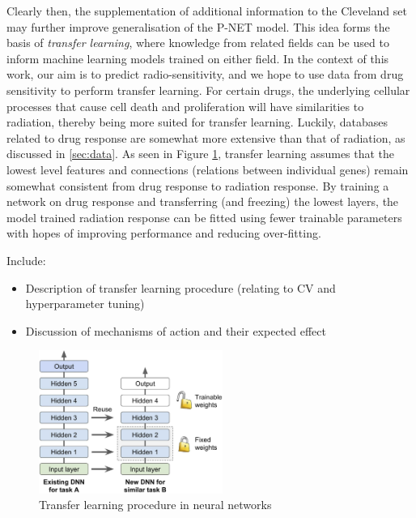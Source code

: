 \documentclass[NOTE, disdraft=true, UKenglish]{\DISCDTLATEXPATH UCLCDTDISdoc}
\begin{document}
Clearly then, the supplementation of additional information to the Cleveland set may further improve generalisation of the P-NET model. This idea forms the basis of \textit{transfer learning}, where knowledge from related fields can be used to inform machine learning models trained on either field. In the context of this work, our aim is to predict radio-sensitivity, and we hope to use data from drug sensitivity to perform transfer learning. For certain drugs, the underlying cellular processes that cause cell death and proliferation will have similarities to radiation, thereby being more suited for transfer learning. Luckily, databases related to drug response are somewhat more extensive than that of radiation, as discussed in \ref{sec:data}. As seen in Figure \ref{fig:3}, transfer learning assumes that the lowest level features and connections (relations between individual genes) remain somewhat consistent from drug response to radiation response. By training a network on drug response and transferring (and freezing) the lowest layers, the model trained radiation response can be fitted using fewer trainable parameters with hopes of improving performance and reducing over-fitting.

{   \color{red}
Include:
\begin{itemize}
\item Description of transfer learning procedure (relating to CV and hyperparameter tuning)
\item Discussion of mechanisms of action and their expected effect
\end{itemize}}

\begin{figure}
    \centering
    \includegraphics[width=6cm]{Figures/transfer_learning.png}
    \caption{Transfer learning procedure in neural networks \cite{McEwann lecture}}
    \label{fig:3}
\end{figure}
\end{document}
